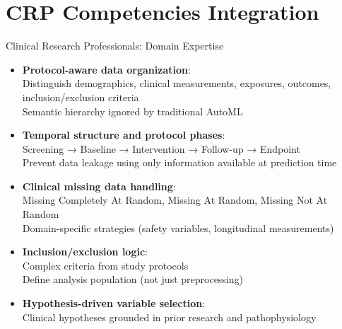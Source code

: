 \documentclass[aspectratio=169,10pt,english,dvipsnames]{beamer}
\begin{document}
\section{CRP Competencies Integration}

\begin{frame}{Clinical Research Professionals: Domain Expertise}
    \begin{itemize}
        \item \textbf{Protocol-aware data organization}:\\
        Distinguish demographics, clinical measurements, exposures, outcomes, inclusion/exclusion criteria\\
        Semantic hierarchy ignored by traditional AutoML
        
        \item \textbf{Temporal structure and protocol phases}:\\
        Screening → Baseline → Intervention → Follow-up → Endpoint\\
        Prevent data leakage using only information available at prediction time
        
        \item \textbf{Clinical missing data handling}:\\
        Missing Completely At Random, Missing At Random, Missing Not At Random\\
        Domain-specific strategies (safety variables, longitudinal measurements)
        
        \item \textbf{Inclusion/exclusion logic}:\\
        Complex criteria from study protocols\\
        Define analysis population (not just preprocessing)
        
        \item \textbf{Hypothesis-driven variable selection}:\\
        Clinical hypotheses grounded in prior research and pathophysiology
    \end{itemize}
\end{frame}
\end{document}
